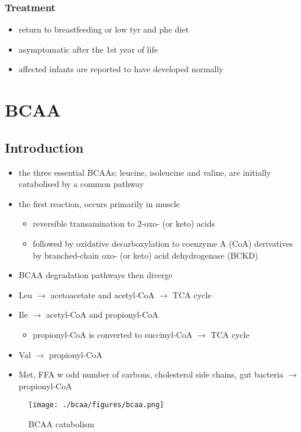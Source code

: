 \documentclass{scrartcl}
\begin{document}
\subsubsection{Treatment}
\label{sec:orge7ec25b}
\begin{itemize}
\item return to breastfeeding or low tyr and phe diet
\item asymptomatic after the 1st year of life
\item affected infants are reported to have developed normally
\end{itemize}

\section{BCAA}
\label{sec:org5861bd7}
\subsection{Introduction}
\label{sec:org5cf458b}
\begin{itemize}
\item the three essential BCAAs: leucine, isoleucine and valine, are
initially catabolised by a common pathway
\item the first reaction, occurs primarily in muscle
\begin{itemize}
\item reversible transamination to 2-oxo- (or keto) acids
\item followed by oxidative decarboxylation to coenzyme A (CoA)
derivatives by branched-chain oxo- (or keto) acid dehydrogenase
(BCKD)
\end{itemize}
\item BCAA degradation pathways then diverge
\item Leu \(\to\) acetoacetate and acetyl-CoA \(\to\) TCA cycle
\item Ile \(\to\) acetyl-CoA and propionyl-CoA
\begin{itemize}
\item propionyl-CoA is converted to succinyl-CoA \(\to\) TCA cycle
\end{itemize}
\item Val \(\to\) propionyl-CoA
\item Met, FFA w odd number of carbons, cholesterol side chains, gut
bacteria \(\to\) propionyl-CoA
\end{itemize}

\begin{figure}[htbp]
\centering
\texttt{[image: ./bcaa/figures/bcaa.png]}
\caption{\label{fig:orgae0c918}
BCAA catabolism}
\end{figure}
\end{document}
